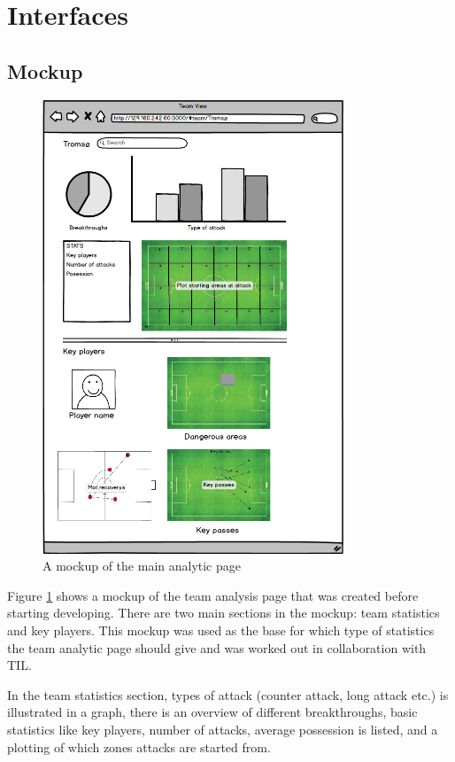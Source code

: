 \section{Interfaces}

\subsection{Mockup}

\begin{figure}[ht!]
\centering
\includegraphics[width=90mm]{images/general/mockup.png}
\caption{A mockup of the main analytic page}
\label{fig:mockup}
\end{figure}

Figure \ref{fig:mockup} shows a mockup of the team analysis page that was created before starting developing. There are two main sections in the mockup: team statistics and key players. This mockup was used as the base for which type of statistics the team analytic page should give and was worked out in collaboration with \ac{TIL}.

In the team statistics section, types of attack (counter attack, long attack etc.) is illustrated in a graph, there is an overview of different breakthroughs, basic statistics like key players, number of attacks, average possession is listed, and a plotting of which zones attacks are started from.

